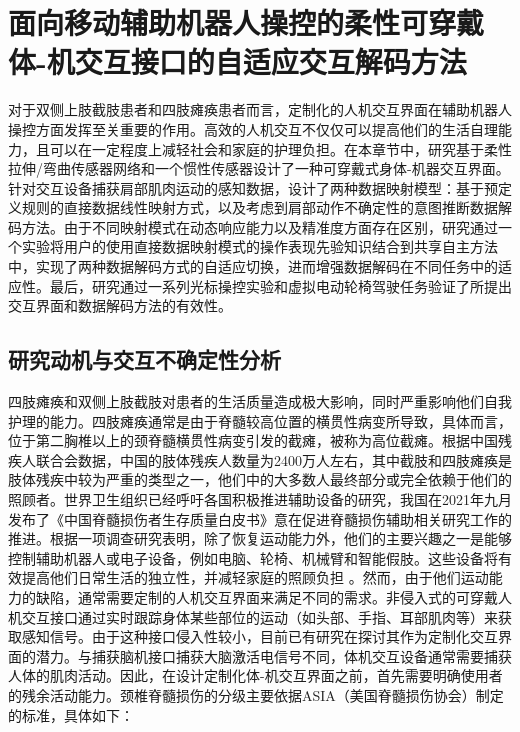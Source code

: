 \chapter{面向移动辅助机器人操控的柔性可穿戴体-机交互接口的自适应交互解码方法}
对于双侧上肢截肢患者和四肢瘫痪患者而言，定制化的人机交互界面在辅助机器人操控方面发挥至关重要的作用。高效的人机交互不仅仅可以提高他们的生活自理能力，且可以在一定程度上减轻社会和家庭的护理负担。在本章节中，研究基于柔性拉伸/弯曲传感器网络和一个惯性传感器设计了一种可穿戴式身体-机器交互界面。针对交互设备捕获肩部肌肉运动的感知数据，设计了两种数据映射模型：基于预定义规则的直接数据线性映射方式，以及考虑到肩部动作不确定性的意图推断数据解码方法。由于不同映射模式在动态响应能力以及精准度方面存在区别，研究通过一个实验将用户的使用直接数据映射模式的操作表现先验知识结合到共享自主方法中，实现了两种数据解码方式的自适应切换，进而增强数据解码在不同任务中的适应性。最后，研究通过一系列光标操控实验和虚拟电动轮椅驾驶任务验证了所提出交互界面和数据解码方法的有效性。

\section{研究动机与交互不确定性分析}    
四肢瘫痪和双侧上肢截肢对患者的生活质量造成极大影响，同时严重影响他们自我护理的能力。四肢瘫痪通常是由于脊髓较高位置的横贯性病变所导致，具体而言，位于第二胸椎以上的颈脊髓横贯性病变引发的截瘫，被称为高位截瘫。根据中国残疾人联合会数据，中国的肢体残疾人数量为2400万人左右，其中截肢和四肢瘫痪是肢体残疾中较为严重的类型之一，他们中的大多数人最终部分或完全依赖于他们的照顾者\cite{vitorinodinizRachimeduralTraumaEpidemiology2016}。世界卫生组织已经呼吁各国积极推进辅助设备的研究，我国在2021年九月发布了《中国脊髓损伤者生存质量白皮书》意在促进脊髓损伤辅助相关研究工作的推进。根据一项调查研究表明，除了恢复运动能力外，他们的主要兴趣之一是能够控制辅助机器人或电子设备，例如电脑、轮椅、机械臂和智能假肢。这些设备将有效提高他们日常生活的独立性，并减轻家庭的照顾负担    \cite{orejuela-zapataSelfHelpDevicesQuadriplegic2019}。然而，由于他们运动能力的缺陷，通常需要定制的人机交互界面来满足不同的需求。非侵入式的可穿戴人机交互接口通过实时跟踪身体某些部位的运动（如头部、手指、耳部肌肉等）来获取感知信号。由于这种接口侵入性较小，目前已有研究在探讨其作为定制化交互界面的潜力\cite{miehlbradtDatadrivenBodyMachine2018a,zhouNonInvasiveHumanMachineInterface2022}。与捕获脑机接口捕获大脑激活电信号不同，体机交互设备通常需要捕获人体的肌肉活动。因此，在设计定制化体-机交互界面之前，首先需要明确使用者的残余活动能力。颈椎脊髓损伤的分级主要依据ASIA（美国脊髓损伤协会）制定的标准\cite{SpinalCordInjury}，具体如下：

